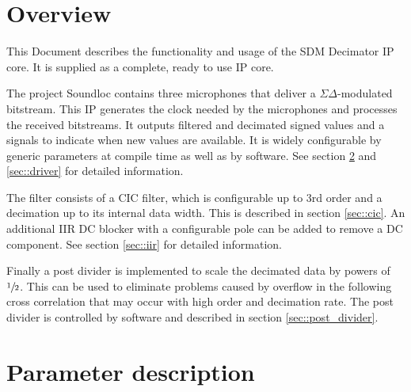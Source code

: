 


\maketitle


\section{Overview}
\label{sec:overview}

This Document describes the functionality and usage of the SDM Decimator IP core.
It is supplied as a complete, ready to use IP core.

The project Soundloc contains three microphones that deliver a $\Sigma\Delta$-modulated bitstream.
This IP generates the clock needed by the microphones and processes the received bitstreams.
It outputs filtered and decimated signed values and a signals to indicate when new values are available.
It is widely configurable by generic parameters at compile time as well as by software.
See section \ref{sec::parameters} and \ref{sec::driver} for detailed information.

The filter consists of a CIC filter, which is configurable up to 3rd order and a decimation up to its internal data width.
This is described in section \ref{sec::cic}.
An additional IIR DC blocker with a configurable pole can be added to remove a DC component. 
See section \ref{sec::iir} for detailed information.

Finally a post divider is implemented to scale the decimated data by powers of $\sfrac{1}{2}$.
This can be used to eliminate problems caused by overflow in the following cross correlation that may occur with high order and decimation rate.
The post divider is controlled by software and described in section \ref{sec::post_divider}.

\section{Parameter description}
\label{sec::parameters}

